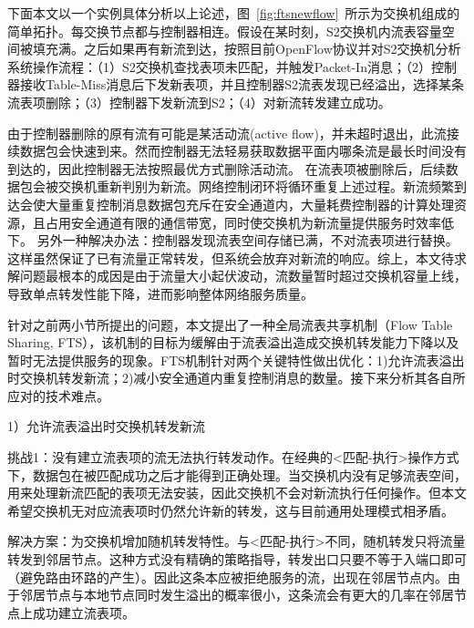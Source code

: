 下面本文以一个实例具体分析以上论述，图~\ref{fig:ftsnewflow}~所示为交换机组成的简单拓扑。每交换节点都与控制器相连。假设在某时刻，S2交换机内流表容量空间被填充满。之后如果再有新流到达，按照目前OpenFlow协议并对S2交换机分析系统操作流程：（1）S2交换机查找表项未匹配，并触发Packet-In消息；（2）控制器接收Table-Miss消息后下发新表项，并且控制器S2流表发现已经溢出，选择某条流表项删除；（3）控制器下发新流到S2；（4）对新流转发建立成功。



由于控制器删除的原有流有可能是某活动流(active flow)，并未超时退出，此流接续数据包会快速到来。然而控制器无法轻易获取数据平面内哪条流是最长时间没有到达的，因此控制器无法按照最优方式删除活动流。
在流表项被删除后，后续数据包会被交换机重新判别为新流。网络控制闭环将循环重复上述过程。新流频繁到达会使大量重复控制消息数据包充斥在安全通道内，大量耗费控制器的计算处理资源，且占用安全通道有限的通信带宽，同时使交换机为新流量提供服务时效率低下。
另外一种解决办法：控制器发现流表空间存储已满，不对流表项进行替换。
这样虽然保证了已有流量正常转发，但系统会放弃对新流的响应。综上，本文待求解问题最根本的成因是由于流量大小起伏波动，流数量暂时超过交换机容量上线，导致单点转发性能下降，进而影响整体网络服务质量。




\label{chap54}

针对之前两小节所提出的问题，本文提出了一种全局流表共享机制（Flow Table Sharing, FTS），该机制的目标为缓解由于流表溢出造成交换机转发能力下降以及暂时无法提供服务的现象。FTS机制针对两个关键特性做出优化：1)允许流表溢出时交换机转发新流；2)减小安全通道内重复控制消息的数量。接下来分析其各自所应对的技术难点。

1）允许流表溢出时交换机转发新流

挑战1：没有建立流表项的流无法执行转发动作。在经典的<匹配-执行>操作方式下，数据包在被匹配成功之后才能得到正确处理。当交换机内没有足够流表空间，用来处理新流匹配的表项无法安装，因此交换机不会对新流执行任何操作。但本文希望交换机无对应流表项时仍然允许新的转发，这与目前通用处理模式相矛盾。

解决方案：为交换机增加随机转发特性。与<匹配-执行>不同，随机转发只将流量转发到邻居节点。这种方式没有精确的策略指导，转发出口只要不等于入端口即可（避免路由环路的产生）。因此这条本应被拒绝服务的流，出现在邻居节点内。由于邻居节点与本地节点同时发生溢出的概率很小，这条流会有更大的几率在邻居节点上成功建立流表项。


